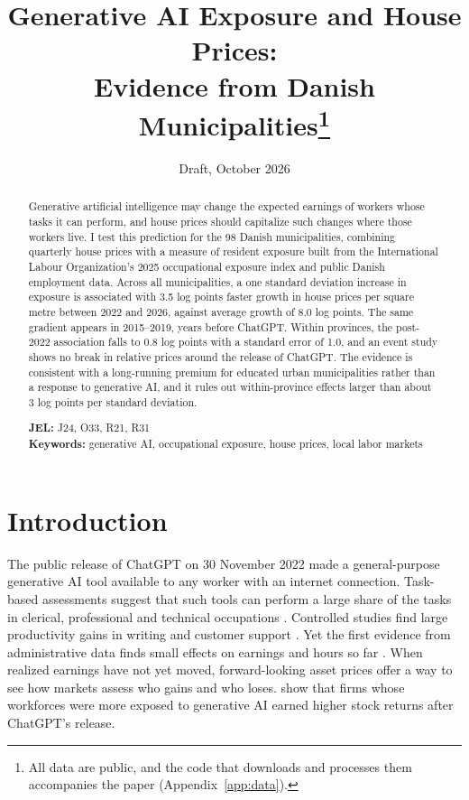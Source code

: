 \documentclass[12pt]{article}
\title{Generative AI Exposure and House Prices:\\ Evidence from Danish Municipalities\thanks{All data are public, and the code that downloads and processes them accompanies the paper (Appendix~\ref{app:data}).}}
\author{}
\date{Draft, October 2026}
\begin{document}
\maketitle

\begin{abstract}
\noindent Generative artificial intelligence may change the expected earnings of workers whose tasks it can perform, and house prices should capitalize such changes where those workers live. I test this prediction for the 98 Danish municipalities, combining quarterly house prices with a measure of resident exposure built from the International Labour Organization's 2025 occupational exposure index and public Danish employment data. Across all municipalities, a one standard deviation increase in exposure is associated with 3.5 log points faster growth in house prices per square metre between 2022 and 2026, against average growth of 8.0 log points. The same gradient appears in 2015--2019, years before ChatGPT. Within provinces, the post-2022 association falls to 0.8 log points with a standard error of 1.0, and an event study shows no break in relative prices around the release of ChatGPT. The evidence is consistent with a long-running premium for educated urban municipalities rather than a response to generative AI, and it rules out within-province effects larger than about 3 log points per standard deviation.

\bigskip
\noindent \textbf{JEL:} J24, O33, R21, R31\\
\noindent \textbf{Keywords:} generative AI, occupational exposure, house prices, local labor markets
\end{abstract}

\newpage

\section{Introduction}

The public release of ChatGPT on 30 November 2022 made a general-purpose generative AI tool available to any worker with an internet connection. Task-based assessments suggest that such tools can perform a large share of the tasks in clerical, professional and technical occupations \citep{eloundou2024, gmyrek2023, gmyrek2025}. Controlled studies find large productivity gains in writing and customer support \citep{noy2023, brynjolfsson2025}. Yet the first evidence from administrative data finds small effects on earnings and hours so far \citep{humlum2025}. When realized earnings have not yet moved, forward-looking asset prices offer a way to see how markets assess who gains and who loses. \citet{eisfeldt2023} show that firms whose workforces were more exposed to generative AI earned higher stock returns after ChatGPT's release.
\end{document}
